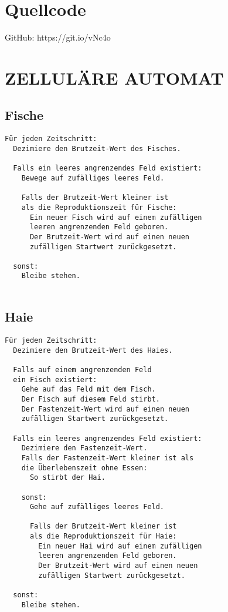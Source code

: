\documentclass[a4paper,twoside]{article}
\begin{document}
	\section*{Quellcode}
	\noindent GitHub: https://git.io/vNc4o	
	
	\newpage
	
	\section{\uppercase{Zelluläre Automat}}
	\subsection{Fische}
	\begin{small}
	\begin{verbatim}
Für jeden Zeitschritt:
  Dezimiere den Brutzeit-Wert des Fisches.
 		
  Falls ein leeres angrenzendes Feld existiert:
    Bewege auf zufälliges leeres Feld.
 			
    Falls der Brutzeit-Wert kleiner ist
    als die Reproduktionszeit für Fische:
      Ein neuer Fisch wird auf einem zufälligen
      leeren angrenzenden Feld geboren.
      Der Brutzeit-Wert wird auf einen neuen
      zufälligen Startwert zurückgesetzt.
 			
  sonst:
    Bleibe stehen. 		
 		
	\end{verbatim}
	\end{small}
	
	\subsection{Haie}
	\begin{small}
	\begin{verbatim}
Für jeden Zeitschritt:
  Dezimiere den Brutzeit-Wert des Haies.
		
  Falls auf einem angrenzenden Feld
  ein Fisch existiert:
    Gehe auf das Feld mit dem Fisch.
    Der Fisch auf diesem Feld stirbt.
    Der Fastenzeit-Wert wird auf einen neuen
    zufälligen Startwert zurückgesetzt.
		    
  Falls ein leeres angrenzendes Feld existiert:
    Dezimiere den Fastenzeit-Wert.
    Falls der Fastenzeit-Wert kleiner ist als 
    die Überlebenszeit ohne Essen:
      So stirbt der Hai.
		        
    sonst:
      Gehe auf zufälliges leeres Feld.
		        
      Falls der Brutzeit-Wert kleiner ist
      als die Reproduktionszeit für Haie:
        Ein neuer Hai wird auf einem zufälligen
        leeren angrenzenden Feld geboren.
        Der Brutzeit-Wert wird auf einen neuen
        zufälligen Startwert zurückgesetzt.
		
  sonst:
    Bleibe stehen. 
		
	\end{verbatim}
	\end{small}
	
\end{document}
